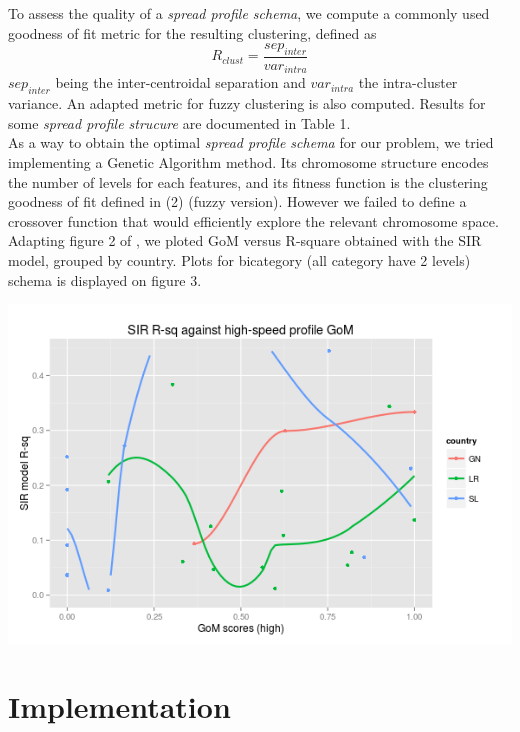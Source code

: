 \documentclass[twoside]{article}
\begin{document}
To assess the quality of a \textit{spread profile schema}, we compute a commonly used goodness of fit metric for the resulting clustering, defined as
\begin{equation}
R_{clust} = \frac{sep_{inter}}{var_{intra}}
\end{equation}
$sep_{inter}$ being the inter-centroidal separation and $var_{intra}$ the intra-cluster variance. An adapted metric for fuzzy clustering is also computed. Results for some \textit{spread profile strucure} are documented in Table 1.\\

As a way to obtain the optimal \textit{spread profile schema} for our problem, we tried implementing a Genetic Algorithm method. Its chromosome structure encodes the number of levels for each features, and its fitness function is the clustering goodness of fit defined in (2) (fuzzy version). However we failed to define a crossover function that would efficiently explore the relevant chromosome space.\\

Adapting figure 2 of \cite{malaria}, we ploted GoM versus R-square obtained with the SIR model, grouped by country. Plots for bicategory (all category have 2 levels) schema is displayed on figure 3.

\vspace{.2 in}
\begingroup
\centering
\includegraphics[scale=0.35]{./img/gom_rsq_bicat.png}
\endgroup

\section{Implementation}
\end{document}
